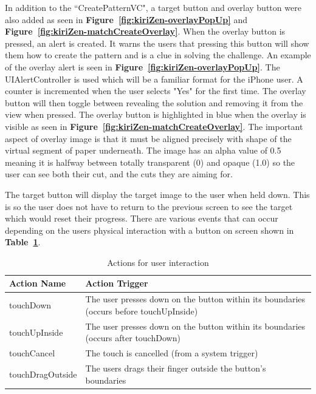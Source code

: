 \documentclass[11pt]{article}
\begin{document}
                    In addition to the ``CreatePatternVC", a target button and overlay button were also added as seen in \textbf{Figure~\ref{fig:kiriZen-overlayPopUp}} and \textbf{Figure~\ref{fig:kiriZen-matchCreateOverlay}}. When the overlay button is pressed, an alert is created. It warns the users that pressing this button will show them how to create the pattern and is a clue in solving the challenge. An example of the overlay alert is seen in \textbf{Figure~\ref{fig:kiriZen-overlayPopUp}}. The UIAlertController is used which will be a familiar format for the iPhone user. A counter is incremented when the user selects "Yes" for the first time. The overlay button will then toggle between revealing the solution and removing it from the view when pressed. The overlay button is highlighted in blue when the overlay is visible as seen in \textbf{Figure~\ref{fig:kiriZen-matchCreateOverlay}}. The important aspect of overlay image is that it must be aligned precisely with shape of the virtual segment of paper underneath. The image has an alpha value of 0.5 meaning it is halfway between totally transparent (0) and opaque (1.0) so the user can see both their cut, and the cuts they are aiming for. 
                    
                    The target button will display the target image to the user when held down. This is so the user does not have to return to the previous screen to see the target which would reset their progress. There are various events that can occur depending on the users physical interaction with a button on screen shown in \textbf{Table~\ref{tab:table2}}.
                    
                    \begin{table}[h!]
                      \begin{center}
                      \caption{Actions for user interaction}
                      \label{tab:table2}
                        \begin{tabular}{|l|p{8cm}|}\hline
                          \textbf{Action Name} & \textbf{Action Trigger}\\\hline
                            touchDown & The user presses down on the button within its boundaries (occurs before touchUpInside) \\\hline
                            touchUpInside & The user presses down on the button within its boundaries (occurs after touchDown) \\\hline
                            touchCancel & The touch is cancelled (from a system trigger) \\\hline
                            touchDragOutside & The users drags their finger outside the button's boundaries\\\hline
                        \end{tabular}
                      \end{center}
                    \end{table}
                    
\end{document}
